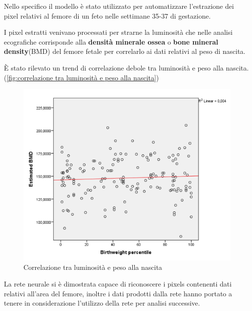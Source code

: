 Nello specifico il modello è stato utilizzato per automatizzare l'estrazione dei pixel relativi al femore di un feto 
nelle settimane 35-37 di gestazione. 

I pixel estratti venivano processati per strarne la luminosità che nelle analisi ecografiche corrisponde 
alla \textbf{densità minerale ossea} o \textbf{bone mineral density}(BMD) del femore fetale
per correlarlo ai dati relativi al peso di nascita.

È stato rilevato un trend di correlazione debole tra luminosit\`a e peso alla nascita. (\autoref{fig:correlazione tra luminosità e peso alla nascita})


\begin{figure}[!ht]
	\begin{adjustbox}{width=0.7\columnwidth, center}
    \includegraphics{./images/correlation_weight_abstract.png}
  \end{adjustbox}
  \caption{Correlazione tra luminosità e peso alla nascita}
  \label{fig:correlazione tra luminosità e peso alla nascita}
\end{figure}

La rete neurale si è dimostrata capace di riconoscere i pixels contenenti dati relativi all'area del femore, inoltre i dati prodotti dalla rete hanno portato a tenere in considerazione 
l'utilizzo della rete per analisi successive.



